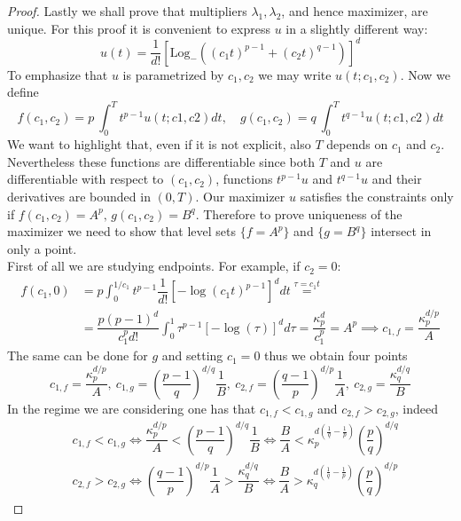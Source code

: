 \documentclass[corpo=11pt, stile=classica, tipotesi=custom,
greek, evenboxes, english]{toptesi}
\numberwithin{equation}{chapter}
\theoremstyle{remark}
\newcommand{\Log}{\ensuremath{\mathrm{Log}_-}}
\begin{document}
\begin{proof}
Lastly we shall prove that multipliers $\lambda_1, \lambda_2$, and hence maximizer, are unique. For this proof it is convenient to express $u$ in a slightly different way:
\begin{equation*}
	u(t) = \dfrac{1}{d!}\left[ \Log\left((c_1t)^{p-1} + (c_2t)^{q-1}\right) \right]^d
\end{equation*} 
To emphasize that $u$ is parametrized by $c_1, c_2$ we may write $u(t;c_1,c_2)$. Now we define
\begin{equation*}
	f(c_1,c_2) = p\ \int_0^T t^{p-1}u(t;c1,c2)dt, \quad g(c_1,c_2) = q\ \int_0^T t^{q-1}u(t;c1,c2)dt
\end{equation*}
We want to highlight that, even if it is not explicit, also $T$ depends on $c_1$ and $c_2$. Nevertheless these functions are differentiable since both $T$ and $u$ are differentiable with respect to $(c_1,c_2)$, functions $t^{p-1}u$ and $t^{q-1}u$ and their derivatives are bounded in $(0,T)$. 
Our maximizer $u$ satisfies the constraints only if $f(c_1,c_2)=A^p, \, g(c_1,c_2) = B^q$. Therefore to prove uniqueness of the maximizer we need to show that level sets $\{f=A^p\}$ and $\{g=B^q\}$ intersect in only a point.\\
First of all we are studying endpoints. For example, if $c_2=0$:
\begin{align*}
	f(c_1,0) &= p\int_0^{1/{c_1}} t^{p-1}\dfrac{1}{d!}\left[-\log(c_1t)^{p-1}\right]^d dt \overset{\tau = c_1t}{=} \\
			 &= \dfrac{p(p-1)^d}{c_1^p d!}\int_0^1 \tau^{p-1}\left[-\log(\tau)\right]^d d\tau = \dfrac{\kappa_p^d}{c_1^p} = A^p \implies c_{1,f} = \dfrac{\kappa_p^{d/p}}{A}
\end{align*}
The same can be done for $g$ and setting $c_1=0$ thus we obtain four points
\begin{equation*}
	c_{1,f} = \dfrac{\kappa_p^{d/p}}{A},\ c_{1,g} = \left(\dfrac{p-1}{q}\right)^{d/q}\dfrac1{B},\ c_{2,f} = \left(\dfrac{q-1}{p}\right)^{d/p}\dfrac1{A},\ c_{2,g} = \dfrac{\kappa_q^{d/q}}{B}
\end{equation*}
In the regime we are considering one has that $c_{1,f} < c_{1,g}$ and $c_{2,f} > c_{2,g}$, indeed
\begin{align*}
	&c_{1,f} < c_{1,g} \iff \dfrac{\kappa_p^{d/p}}{A} < \left(\dfrac{p-1}{q}\right)^{d/q}\dfrac1{B} \iff \dfrac{B}{A} < \kappa_p^{d\left( \frac1{q}-\frac1{p}\right)}\left(\dfrac{p}{q}\right)^{d/q}\\
	&c_{2,f} > c_{2,g} \iff \left(\dfrac{q-1}{p}\right)^{d/p}\dfrac1{A} > \dfrac{\kappa_q^{d/q}}{B} \iff \dfrac{B}{A} > \kappa_q^{d\left( \frac1{q}-\frac1{p}\right)}\left(\dfrac{p}{q}\right)^{d/p}

\end{align*}
\end{proof}
\end{document}
